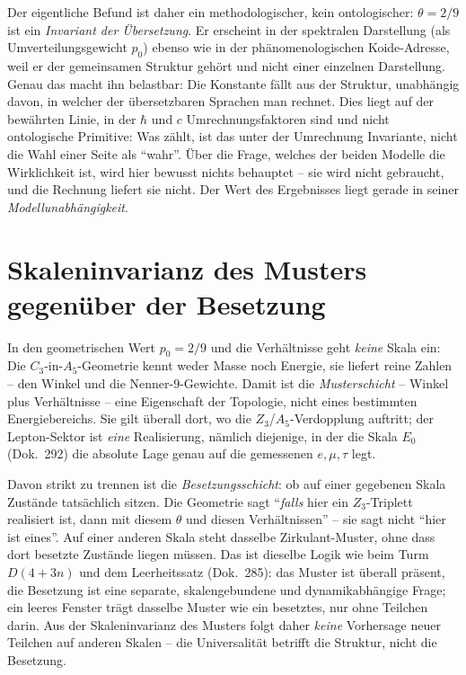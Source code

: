 Der eigentliche Befund ist daher ein methodologischer, kein ontologischer: $\theta=2/9$ ist ein
\emph{Invariant der Übersetzung}. Er erscheint in der spektralen Darstellung (als
Umverteilungsgewicht $p_0$) ebenso wie in der phänomenologischen Koide-Adresse, weil er der
gemeinsamen Struktur gehört und nicht einer einzelnen Darstellung. Genau das macht ihn belastbar:
Die Konstante fällt aus der Struktur, unabhängig davon, in welcher der übersetzbaren Sprachen man
rechnet. Dies liegt auf der bewährten Linie, in der $\hbar$ und $c$ Umrechnungsfaktoren sind und
nicht ontologische Primitive: Was zählt, ist das unter der Umrechnung Invariante, nicht die Wahl
einer Seite als \enquote{wahr}. Über die Frage, welches der beiden Modelle die Wirklichkeit ist,
wird hier bewusst nichts behauptet -- sie wird nicht gebraucht, und die Rechnung liefert sie
nicht. Der Wert des Ergebnisses liegt gerade in seiner \emph{Modellunabhängigkeit}.

\section{Skaleninvarianz des Musters gegenüber der Besetzung}
In den geometrischen Wert $p_0=2/9$ und die Verhältnisse geht \emph{keine} Skala ein: Die
$C_3$-in-$A_5$-Geometrie kennt weder Masse noch Energie, sie liefert reine Zahlen -- den Winkel
und die Nenner-$9$-Gewichte. Damit ist die \emph{Musterschicht} -- Winkel plus Verhältnisse --
eine Eigenschaft der Topologie, nicht eines bestimmten Energiebereichs. Sie gilt überall dort,
wo die $Z_3$/$A_5$-Verdopplung auftritt; der Lepton-Sektor ist \emph{eine} Realisierung, nämlich
diejenige, in der die Skala $E_0$ (Dok.~292) die absolute Lage genau auf die gemessenen
$e,\mu,\tau$ legt.

Davon strikt zu trennen ist die \emph{Besetzungsschicht}: ob auf einer gegebenen Skala Zustände
tatsächlich sitzen. Die Geometrie sagt \enquote{\emph{falls} hier ein $Z_3$-Triplett realisiert
ist, dann mit diesem $\theta$ und diesen Verhältnissen} -- sie sagt nicht \enquote{hier ist
eines}. Auf einer anderen Skala steht dasselbe Zirkulant-Muster, ohne dass dort besetzte Zustände
liegen müssen. Das ist dieselbe Logik wie beim Turm $D(4+3n)$ und dem Leerheitssatz (Dok.~285):
das Muster ist überall präsent, die Besetzung ist eine separate, skalengebundene und
dynamikabhängige Frage; ein leeres Fenster trägt dasselbe Muster wie ein besetztes, nur ohne
Teilchen darin. Aus der Skaleninvarianz des Musters folgt daher \emph{keine} Vorhersage neuer
Teilchen auf anderen Skalen -- die Universalität betrifft die Struktur, nicht die Besetzung.


